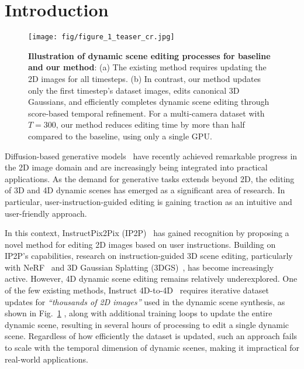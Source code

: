 \section{Introduction}
\label{sec:intro}

\begin{figure}[!t]
\centering
    \texttt{[image: fig/figure\_1\_teaser\_cr.jpg]}
    \vspace{-6mm}
    \caption{\textbf{Illustration of dynamic scene editing processes for baseline and our method}: (a) The existing method requires updating the 2D images for all timesteps. (b) In contrast, our method updates only the first timestep's dataset images, edits canonical 3D Gaussians, and efficiently completes dynamic scene editing through score-based temporal refinement. For a multi-camera dataset with $T=300$, our method reduces editing time by more than half compared to the baseline, using only a single GPU.}
    \label{fig:teaser}
\vspace{-4mm}
\end{figure}

Diffusion-based generative models~\cite{ref_26_ddpm, ref_2_ldm, ref_66_scalable, ref_67_plug, ref_68_controlnet, ref_69_dreambooth, ref_70_hierarchical} have recently achieved remarkable progress in the 2D image domain and are increasingly being integrated into practical applications. As the demand for generative tasks extends beyond 2D, the editing of 3D and 4D dynamic scenes has emerged as a significant area of research. In particular, user-instruction-guided editing is gaining traction as an intuitive and user-friendly approach.

In this context, InstructPix2Pix (IP2P)~\cite{ref_1_ip2p} has gained recognition by proposing a novel method for editing 2D images based on user instructions. Building on IP2P’s capabilities, research on instruction-guided 3D scene editing, particularly with NeRF~\cite{ref_4_nerf} and 3D Gaussian Splatting (3DGS)~\cite{ref_8_gs}, has become increasingly active. However, 4D dynamic scene editing remains relatively underexplored. One of the few existing methods, Instruct 4D-to-4D~\cite{ref_9_i4d24d} requires iterative dataset updates for \emph{``thousands of 2D images''} used in the dynamic scene synthesis, as shown in Fig.~\ref{fig:teaser} , along with additional training loops to update the entire dynamic scene, resulting in several hours of processing to edit a single dynamic scene. Regardless of how efficiently the dataset is updated, such an approach fails to scale with the temporal dimension of dynamic scenes, making it impractical for real-world applications.

